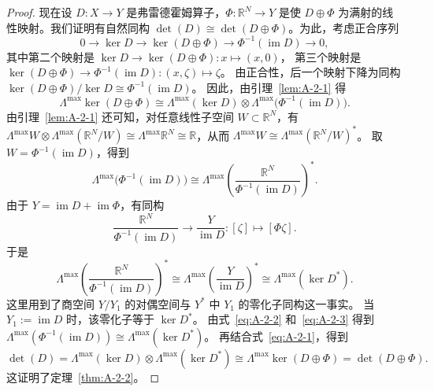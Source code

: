\begin{proof}
现在设 $D:X\to Y$ 是弗雷德霍姆算子，$\Phi:\mathbb R^N\to Y$ 是使
$D\oplus\Phi$ 为满射的线性映射。我们证明有自然同构
$\det(D)\cong\det(D\oplus\Phi)$。为此，考虑正合序列
\[
  0\longrightarrow\ker D\longrightarrow\ker(D\oplus\Phi)
  \longrightarrow\Phi^{-1}(\operatorname{im}D)\longrightarrow0,
\]
其中第二个映射是 $\ker D\to\ker(D\oplus\Phi):x\mapsto(x,0)$，
第三个映射是
$\ker(D\oplus\Phi)\to\Phi^{-1}(\operatorname{im}D):(x,\zeta)\mapsto\zeta$。
由正合性，后一个映射下降为同构
$\ker(D\oplus\Phi)/\ker D\cong\Phi^{-1}(\operatorname{im}D)$。
因此，由引理~\ref{lem:A-2-1} 得
\begin{equation}\label{eq:A-2-1}
  \Lambda^{\max}\ker(D\oplus\Phi)
  \cong\Lambda^{\max}(\ker D)
  \otimes\Lambda^{\max}\bigl(\Phi^{-1}(\operatorname{im}D)\bigr).
\end{equation}
由引理~\ref{lem:A-2-1} 还可知，对任意线性子空间
$W\subset\mathbb R^N$，有
$\Lambda^{\max}W\otimes\Lambda^{\max}(\mathbb R^N/W)
\cong\Lambda^{\max}\mathbb R^N\cong\mathbb R$，从而
$\Lambda^{\max}W\cong\Lambda^{\max}(\mathbb R^N/W)^*$。
取 $W=\Phi^{-1}(\operatorname{im}D)$，得到
\begin{equation}\label{eq:A-2-2}
  \Lambda^{\max}\bigl(\Phi^{-1}(\operatorname{im}D)\bigr)
  \cong\Lambda^{\max}
  \left(\frac{\mathbb R^N}{\Phi^{-1}(\operatorname{im}D)}\right)^*.
\end{equation}
由于 $Y=\operatorname{im}D+\operatorname{im}\Phi$，有同构
\[
  \frac{\mathbb R^N}{\Phi^{-1}(\operatorname{im}D)}
  \longrightarrow\frac{Y}{\operatorname{im}D}:
  [\zeta]\longmapsto[\Phi\zeta].
\]
于是
\begin{equation}\label{eq:A-2-3}
  \Lambda^{\max}
  \left(\frac{\mathbb R^N}{\Phi^{-1}(\operatorname{im}D)}\right)^*
  \cong\Lambda^{\max}\left(\frac{Y}{\operatorname{im}D}\right)^*
  \cong\Lambda^{\max}(\ker D^*).
\end{equation}
这里用到了商空间 $Y/Y_1$ 的对偶空间与 $Y^*$ 中 $Y_1$ 的零化子同构这一事实。
当 $Y_1:=\operatorname{im}D$ 时，该零化子等于 $\ker D^*$。
由式~\eqref{eq:A-2-2} 和~\eqref{eq:A-2-3} 得到
$\Lambda^{\max}(\Phi^{-1}(\operatorname{im}D))
\cong\Lambda^{\max}(\ker D^*)$。
再结合式~\eqref{eq:A-2-1}，得到
\[
  \det(D)=\Lambda^{\max}(\ker D)\otimes\Lambda^{\max}(\ker D^*)
  \cong\Lambda^{\max}\ker(D\oplus\Phi)=\det(D\oplus\Phi).
\]
这证明了定理~\ref{thm:A-2-2}。
\end{proof}

